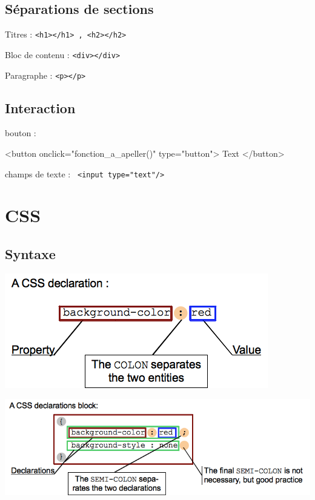\documentclass[10pt, landscape, french]{article}
\newcommand{\codeHTMLinline}[2] {
	#1 : \texttt{#2}
  }
\newenvironment{codeHTML}[1]{%
#1 :  %
\minted{HTML}%
}{%
\endminted%
}
\begin{document}
\begin{multicols}{3}
\subsection{Séparations de sections}
\codeHTMLinline{Titres}{<h1></h1> , <h2></h2>}
\codeHTMLinline{Bloc de contenu}{<div></div>}
\codeHTMLinline{Paragraphe}{<p></p>}

\subsection{Interaction}
\begin{codeHTML}{bouton}
<button 
  onclick="fonction_a_apeller()" 
  type="button">
	Text
</button>
\end{codeHTML}
\codeHTMLinline{champs de texte}{	<input type="text"/>}


		\section{CSS}
\subsection{Syntaxe}    

\begin{center}
 \includegraphics[width=0.9\linewidth]{css_syntax-declaration.png}
\end{center}    

\begin{center}
 \includegraphics[width=0.9\linewidth]{css_syntax-declarations-block.png}
\end{center}    


\end{multicols}
\end{document}
